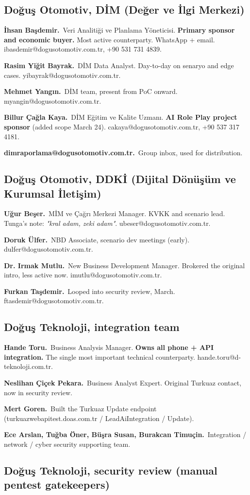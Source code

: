 \documentclass[10pt,a4paper]{article}
\newcommand{\datum}[2]{\textbf{\color{NavyDark}\small #1.}~\color{Ink}\small #2\par\smallskip}
\begin{document}
\subsection{Doğuş Otomotiv, DİM (Değer ve İlgi Merkezi)}

\datum{İhsan Başdemir}{Veri Analitiği ve Planlama Yöneticisi. \textbf{Primary sponsor and economic buyer.} Most active counterparty. WhatsApp + email. ibasdemir@dogusotomotiv.com.tr, +90 531 731 4839.}
\datum{Rasim Yiğit Bayrak}{DİM Data Analyst. Day-to-day on senaryo and edge cases. yibayrak@dogusotomotiv.com.tr.}
\datum{Mehmet Yangın}{DİM team, present from PoC onward. myangin@dogusotomotiv.com.tr.}
\datum{Billur Çağla Kaya}{DİM Eğitim ve Kalite Uzmanı. \textbf{AI Role Play project sponsor} (added scope March 24). cakaya@dogusotomotiv.com.tr, +90 537 317 4181.}
\datum{dimraporlama@dogusotomotiv.com.tr}{Group inbox, used for distribution.}

\subsection{Doğuş Otomotiv, DDKİ (Dijital Dönüşüm ve Kurumsal İletişim)}

\datum{Uğur Beşer}{MİM ve Çağrı Merkezi Manager. KVKK and scenario lead. Tunga's note: \emph{"kral adam, zeki adam"}. ubeser@dogusotomotiv.com.tr.}
\datum{Doruk Ülfer}{NBD Associate, scenario dev meetings (early). dulfer@dogusotomotiv.com.tr.}
\datum{Dr. Irmak Mutlu}{New Business Development Manager. Brokered the original intro, less active now. imutlu@dogusotomotiv.com.tr.}
\datum{Furkan Taşdemir}{Looped into security review, March. ftasdemir@dogusotomotiv.com.tr.}

\subsection{Doğuş Teknoloji, integration team}

\datum{Hande Toru}{Business Analysis Manager. \textbf{Owns all phone + API integration.} The single most important technical counterparty. hande.toru@d-teknoloji.com.tr.}
\datum{Neslihan Çiçek Pekara}{Business Analyst Expert. Original Turkuaz contact, now in security review.}
\datum{Mert Goren}{Built the Turkuaz Update endpoint (turkuazwebapitest.doas.com.tr / LeadAiIntegration / Update).}
\datum{Ece Arslan, Tuğba Öner, Büşra Susan, Burakcan Timuçin}{Integration / network / cyber security supporting team.}

\subsection{Doğuş Teknoloji, security review (manual pentest gatekeepers)}
\end{document}
